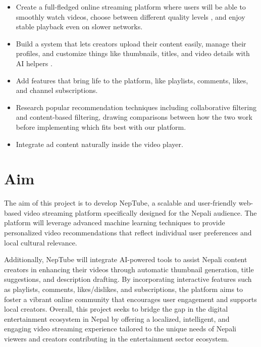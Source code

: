 \begin{itemize}[leftmargin=2cm]
  \item Create a full-fledged online streaming platform where users will be able to smoothly watch videos, choose between different quality levels \cite{flowplayer2023abr}, and enjoy stable playback even on slower networks.

  \item Build a system that lets creators upload their content easily, manage their profiles, and customize things like thumbnails, titles, and video details with AI helpers \cite{googlecloud2024genai}.

  \item Add features that bring life to the platform, like playlists, comments, likes, and channel subscriptions.

  \item Research popular recommendation techniques \cite{twitter2023algorithm} including collaborative filtering and content-based filtering, drawing comparisons between how the two work before implementing which fits best with our platform.

  \item Integrate ad content naturally inside the video player.
\end{itemize}

\section{Aim}

The aim of this project is to develop NepTube, a scalable and user-friendly web-based video streaming platform specifically designed for the Nepali audience. The platform will leverage advanced machine learning \cite{ibm2025contentfiltering, pujari2023mern} techniques to provide personalized video recommendations that reflect individual user preferences and local cultural relevance.

Additionally, NepTube will integrate AI-powered tools to assist Nepali content creators in enhancing their videos through automatic thumbnail generation, title suggestions, and description drafting. By incorporating interactive features such as playlists, comments, likes/dislikes, and subscriptions, the platform aims to foster a vibrant online community that encourages user engagement and supports local creators. Overall, this project seeks to bridge the gap in the digital entertainment ecosystem in Nepal by offering a localized, intelligent, and engaging video streaming experience tailored to the unique needs of Nepali viewers and creators contributing in the entertainment sector ecosystem.

